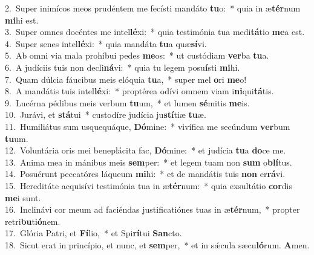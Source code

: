 {2.~}Super inimícos meos prudéntem me fecísti mandáto \textbf{tu}o:~* quia in æ\textbf{tér}num \textbf{mi}hi est.\\
{3.~}Super omnes docéntes me intel\textbf{lé}xi:~* quia testimónia tua medi\textbf{tá}tio \textbf{me}a est.\\
{4.~}Super senes intel\textbf{lé}xi:~* quia mandáta \textbf{tu}a quæ\textbf{sí}vi.\\
{5.~}Ab omni via mala prohíbui pedes \textbf{me}os:~* ut custódiam \textbf{ver}ba \textbf{tu}a.\\
{6.~}A judíciis tuis non decli\textbf{ná}vi:~* quia tu legem posu\textbf{í}sti \textbf{mi}hi.\\
{7.~}Quam dúlcia fáucibus meis elóquia \textbf{tu}a,~* super mel \textbf{o}ri \textbf{me}o!\\
{8.~}A mandátis tuis intel\textbf{lé}xi:~* proptérea odívi omnem viam i\textbf{ni}qui\textbf{tá}tis.\\
{9.~}Lucérna pédibus meis verbum \textbf{tu}um,~* et lumen \textbf{sé}mitis \textbf{me}is.\\
{10.~}Jurávi, et \textbf{stá}tui~* custodíre judícia ju\textbf{stí}tiæ \textbf{tu}æ.\\
{11.~}Humiliátus sum usquequáque, \textbf{Dó}mine:~* vivífica me secúndum \textbf{ver}bum \textbf{tu}um.\\
{12.~}Voluntária oris mei beneplácita fac, \textbf{Dó}mine:~* et judícia \textbf{tu}a \textbf{do}ce me.\\
{13.~}Anima mea in mánibus meis \textbf{sem}per:~* et legem tuam non \textbf{sum} o\textbf{blí}tus.\\
{14.~}Posuérunt peccatóres láqueum \textbf{mi}hi:~* et de mandátis tuis \textbf{non} er\textbf{rá}vi.\\
{15.~}Hereditáte acquisívi testimónia tua in æ\textbf{tér}num:~* quia exsultátio \textbf{cor}dis \textbf{me}i sunt.\\
{16.~}Inclinávi cor meum ad faciéndas justificatiónes tuas in æ\textbf{tér}num,~* propter retri\textbf{bu}ti\textbf{ó}nem.\\
{17.~}Glória Patri, et \textbf{Fí}lio,~* et Spi\textbf{rí}tui \textbf{San}cto.\\
{18.~}Sicut erat in princípio, et nunc, et \textbf{sem}per,~* et in sǽcula sæcu\textbf{ló}rum. \textbf{A}men.\\
